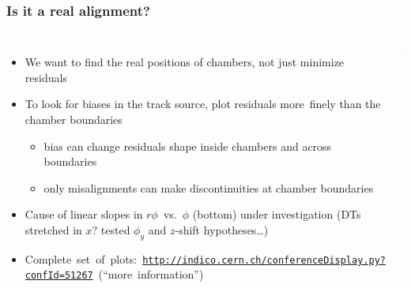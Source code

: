 \documentclass[compress]{beamer}
\begin{document}
\begin{frame}
\frametitle{Is it a real alignment?}
\label{page:rphivsphi}

\hspace{-0.3 cm}
\begin{minipage}{\linewidth}
\begin{columns}
\begin{itemize}
\item We want to find the real positions of chambers, not just minimize residuals
\item To look for biases in the track source, plot residuals \mbox{more finely\hspace{-0.5 cm}} than the chamber boundaries
\begin{itemize}
\item bias can change residuals shape inside chambers and across boundaries
\item only misalignments can make discontinuities at chamber boundaries
\end{itemize}
\item Cause of linear slopes in \mbox{$r\phi$ vs.\ $\phi$\hspace{-0.5 cm}} (bottom) under investigation {\scriptsize (DTs stretched in $x$?  tested $\phi_y$ and $z$-shift hypotheses\ldots)}

\item \mbox{Complete set of plots: \textcolor{blue}{\tt \tiny \href{http://indico.cern.ch/conferenceDisplay.py?confId=51267}{http://indico.cern.ch/conferenceDisplay.py?confId=51267}} \tiny (``more information'')\hspace{-10 cm}}
\end{itemize}


\includegraphics[height=1.1\linewidth, angle=90]{alignmentplots_example1.pdf}


\end{columns}
\end{minipage}
\end{frame}
\end{document}
